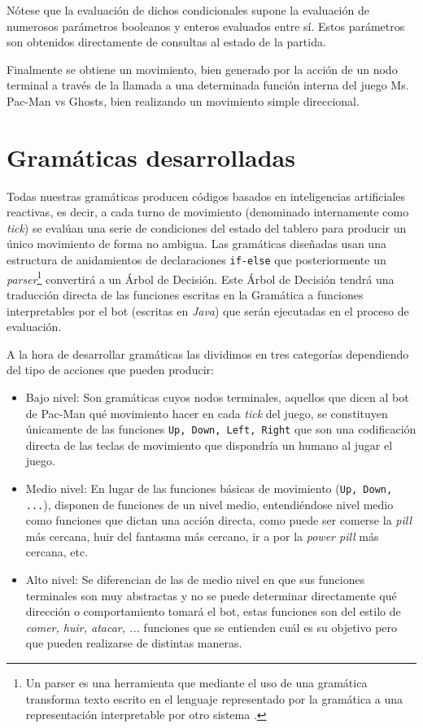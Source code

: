 Nótese  que la evaluación de dichos condicionales supone la evaluación de numerosos parámetros booleanos y enteros evaluados entre sí. Estos parámetros son obtenidos directamente de consultas al estado de la partida.

Finalmente se obtiene un movimiento, bien generado por la acción de un nodo terminal a través de la llamada a una determinada función interna del juego Ms. Pac-Man vs Ghosts, bien realizando un movimiento simple direccional.

\section{Gramáticas desarrolladas}
Todas nuestras gramáticas producen códigos basados en inteligencias artificiales reactivas, es decir, a cada turno de movimiento (denominado internamente como \textit{tick}) se evalúan una serie de condiciones del estado del tablero para producir un único movimiento de forma no ambigua. Las gramáticas diseñadas usan una estructura de anidamientos de declaraciones \texttt{if-else} que posteriormente un \textit{parser}\footnote{Un parser es una herramienta que mediante el uso de una gramática transforma texto escrito en el lenguaje representado por la gramática a una representación interpretable por otro sistema \cite{parserTechopedia}.
} convertirá a un Árbol de Decisión. Este Árbol de Decisión tendrá una traducción directa de las funciones escritas en la Gramática a funciones interpretables por el bot (escritas en \textit{Java}) que serán ejecutadas en el proceso de evaluación.
 
A la hora de desarrollar gramáticas las dividimos en tres categorías dependiendo del tipo de acciones que pueden producir:
\begin{itemize}
\item Bajo nivel: Son gramáticas cuyos nodos terminales, aquellos que dicen al bot de Pac-Man qué movimiento hacer en cada \textit{tick} del juego, se constituyen únicamente de las funciones \texttt{Up, Down, Left, Right} que son una codificación directa de las teclas de movimiento que dispondría un humano al jugar el juego.

\item Medio nivel: En lugar de las funciones básicas de movimiento (\texttt{Up, Down, ...}), disponen de funciones de un nivel medio,  entendiéndose nivel medio como funciones que dictan una acción directa, como puede ser comerse la \textit{pill} más cercana, huir del fantasma más cercano, ir a por la \textit{power pill} más cercana, etc.

\item Alto nivel: Se diferencian de las de medio nivel en que sus funciones terminales son muy abstractas y no se puede determinar directamente qué dirección o comportamiento tomará el bot, estas funciones son del estilo de \textit{comer, huir, atacar, ...} funciones que se entienden cuál es su objetivo pero que pueden realizarse de distintas maneras.
\end{itemize}

